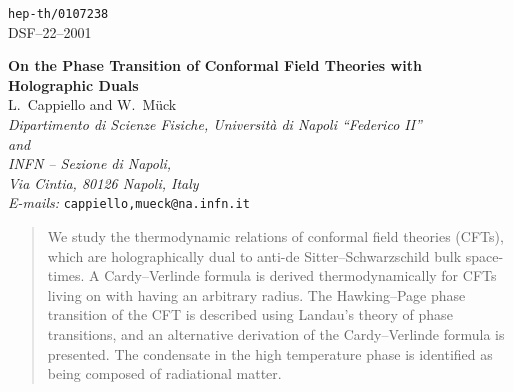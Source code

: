 \documentclass[a4paper,12pt]{article}
\begin{document}
\providecommand{\V}{\mathcal{V}}
\providecommand{\rh}{\hat{r}}

\begin{titlepage}

\begin{flushright}
                             \texttt{hep-th/0107238}\\
                             DSF--22--2001
\end{flushright}
\vspace{1.5cm}

\begin{center}
\renewcommand{\baselinestretch}{1.8}\normalsize
\textbf{\LARGE On the Phase Transition of Conformal Field Theories
with Holographic Duals}\\[1.5cm]

{\large L.~Cappiello and W.~M{\"{u}}ck}\\[0.5cm]

\renewcommand{\baselinestretch}{1.2}\normalsize
\emph{Dipartimento di Scienze Fisiche, Universit\`{a} di Napoli
``Federico II''}\\
\emph{and}\\
\emph{INFN -- Sezione di Napoli,}\\
\emph{Via Cintia, 80126 Napoli, Italy}\\[12pt]
\emph{E-mails:} \texttt{cappiello,mueck@na.infn.it}\\[1.5cm]
\end{center}

\begin{abstract}
We study the thermodynamic relations of conformal field theories
(CFTs), which are holographically dual to anti-de
Sitter--Schwarzschild bulk space-times.
A Cardy--Verlinde formula is derived thermodynamically for
CFTs living on \coordHE{} with \coordHE{} having an arbitrary
radius. The Hawking--Page phase transition of the CFT is described
using Landau's theory of phase transitions, and an alternative
derivation of the Cardy--Verlinde formula is presented. The condensate
in the high temperature phase is identified as being composed of
radiational matter.
\end{abstract}
\end{titlepage}
\end{document}
